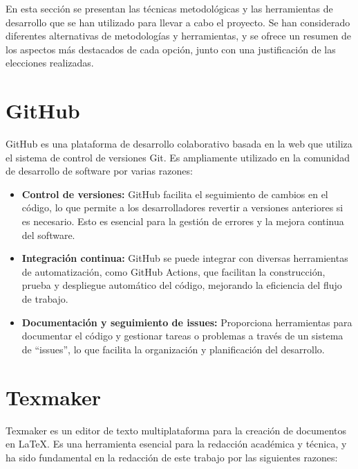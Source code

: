 
En esta sección se presentan las técnicas metodológicas y las herramientas de desarrollo que se han utilizado para llevar a cabo el proyecto. Se han considerado diferentes alternativas de metodologías y herramientas, y se ofrece un resumen de los aspectos más destacados de cada opción, junto con una justificación de las elecciones realizadas.

\section{GitHub}
GitHub es una plataforma de desarrollo colaborativo basada en la web que utiliza el sistema de control de versiones Git. Es ampliamente utilizado en la comunidad de desarrollo de software por varias razones:

\begin{itemize}
    \item \textbf{Control de versiones:} GitHub facilita el seguimiento de cambios en el código, lo que permite a los desarrolladores revertir a versiones anteriores si es necesario. Esto es esencial para la gestión de errores y la mejora continua del software.
    \item \textbf{Integración continua:} GitHub se puede integrar con diversas herramientas de automatización, como GitHub Actions, que facilitan la construcción, prueba y despliegue automático del código, mejorando la eficiencia del flujo de trabajo.
    \item \textbf{Documentación y seguimiento de issues:} Proporciona herramientas para documentar el código y gestionar tareas o problemas a través de un sistema de “issues”, lo que facilita la organización y planificación del desarrollo.
\end{itemize}

\section{Texmaker}
Texmaker es un editor de texto multiplataforma para la creación de documentos en \LaTeX. Es una herramienta esencial para la redacción académica y técnica, y ha sido fundamental en la redacción de este trabajo por las siguientes razones:

